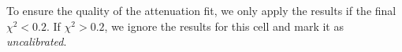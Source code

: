 To ensure the quality of the attenuation fit, we only apply the results if the final $\chi^2<0.2$. If $\chi^2>0.2$, we ignore the results for this cell and mark it as \textit{uncalibrated}.




